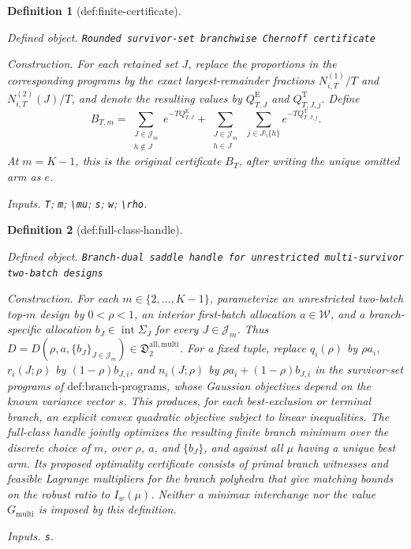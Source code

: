 \documentclass{article}
\newtheorem{definition}{Definition}
\begin{document}
\begin{definition}[def:finite-certificate]\label{def:finite-certificate}
\par\smallskip\noindent\emph{Defined object.} \texttt{Rounded survivor-\allowbreak{}set branchwise Chernoff certificate}
\par\smallskip\noindent\emph{Construction.} For each retained set \(J\), replace the proportions in the corresponding programs by the exact largest-remainder fractions \(N_{i,T}^{(1)}/T\) and \(N_{i,T}^{(2)}(J)/T\), and denote the resulting values by \(Q_{T,J}^{\mathrm E}\) and \(Q_{T,J,j}^{\mathrm T}\). Define
\[
 B_{T,m}=\sum_{\substack{J\in\mathcal J_m\\h\notin J}}e^{-TQ_{T,J}^{\mathrm E}}
 +\sum_{\substack{J\in\mathcal J_m\\h\in J}}\ \sum_{j\in J\setminus\{h\}}e^{-TQ_{T,J,j}^{\mathrm T}}.
\]
At \(m=K-1\), this is the original certificate \(B_T\), after writing the unique omitted arm as \(e\).
\par\smallskip\noindent\emph{Inputs.} \texttt{T}; \texttt{m}; \texttt{\textbackslash{}\allowbreak{}mu}; \texttt{s}; \texttt{w}; \texttt{\textbackslash{}\allowbreak{}rho}.
\end{definition}

\begin{definition}[def:full-class-handle]\label{def:full-class-handle}
\par\smallskip\noindent\emph{Defined object.} \texttt{Branch-\allowbreak{}dual saddle handle for unrestricted multi-\allowbreak{}survivor two-\allowbreak{}batch designs}
\par\smallskip\noindent\emph{Construction.} For each \(m\in\{2,\ldots,K-1\}\), parameterize an unrestricted two-batch top-\(m\) design by \(0<\rho<1\), an interior first-batch allocation \(a\in\mathcal W\), and a branch-specific allocation \(b_J\in\operatorname{int}\Sigma_J\) for every \(J\in\mathcal J_m\).  Thus \(D=D(\rho,a,\{b_J\}_{J\in\mathcal J_m})\in\mathfrak D_2^{\mathrm{all,multi}}\).  For a fixed tuple, replace \(q_i(\rho)\) by \(\rho a_i\), \(r_i(J;\rho)\) by \((1-\rho)b_{J,i}\), and \(n_i(J;\rho)\) by \(\rho a_i+(1-\rho)b_{J,i}\) in the survivor-set programs of \(\text{def:branch-programs}\), whose Gaussian objectives depend on the known variance vector \(s\).  This produces, for each best-exclusion or terminal branch, an explicit convex quadratic objective subject to linear inequalities.  The full-class handle jointly optimizes the resulting finite branch minimum over the discrete choice of \(m\), over \(\rho\), \(a\), and \(\{b_J\}\), and against all \(\mu\) having a unique best arm.  Its proposed optimality certificate consists of primal branch witnesses and feasible Lagrange multipliers for the branch polyhedra that give matching bounds on the robust ratio to \(I_w(\mu)\).  Neither a minimax interchange nor the value \(G_{\mathrm{multi}}\) is imposed by this definition.
\par\smallskip\noindent\emph{Inputs.} \texttt{s}.
\end{definition}
\end{document}
